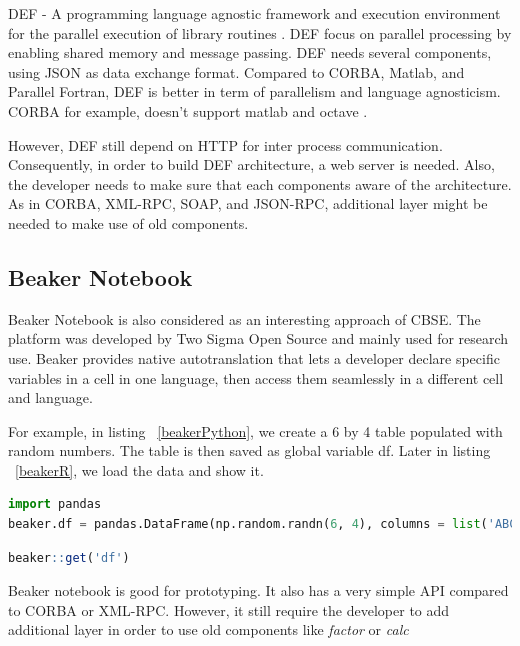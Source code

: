 \documentclass[conference]{IEEEtran}
\begin{document}
DEF - A programming language agnostic framework and execution environment 
for the parallel execution of library routines \cite{feilhauer2016def}. 
DEF focus on parallel processing by enabling shared memory and message passing. 
DEF needs several components, using JSON as data exchange format. 
Compared to CORBA, Matlab, and Parallel Fortran, DEF is better in term of 
parallelism and language agnosticism. CORBA for example, doesn't support matlab and 
octave \cite{feilhauer2016def}. 

However, DEF still depend on HTTP for inter process communication. Consequently, 
in order to build DEF architecture, a web server is needed. Also, the developer needs 
to make sure that each components aware of the architecture. As in CORBA, XML-RPC, 
SOAP, and JSON-RPC, additional layer might be needed to make use of old components.

\subsection{Beaker Notebook}

Beaker Notebook \cite{beakernotebook} is also considered as an interesting 
approach of CBSE. The platform was developed by Two Sigma Open Source and 
mainly used for research use.  Beaker provides native autotranslation that 
lets a developer declare specific variables in a cell in one language, 
then access them seamlessly in a different cell and language.

For example, in listing ~\ref{beakerPython}, we create a 6 by 4 table populated with
random numbers. The table is then saved as global variable df. 
Later in listing ~\ref{beakerR}, we load the data and show it.

\begin{lstlisting}[caption=Beaker Python Cell Example, label=beakerPython, language=python, basicstyle=\small, breaklines=true]
import pandas
beaker.df = pandas.DataFrame(np.random.randn(6, 4), columns = list('ABCD'))
\end{lstlisting}

\begin{lstlisting}[caption=Beaker R Cell Example, label=beakerR, language=R, basicstyle=\small, breaklines=true]
beaker::get('df')
\end{lstlisting}

Beaker notebook is good for prototyping. It also has a very simple API compared to
CORBA or XML-RPC. However, it still require the developer to add additional layer
in order to use old components like {\it factor} or {\it calc}
\end{document}
